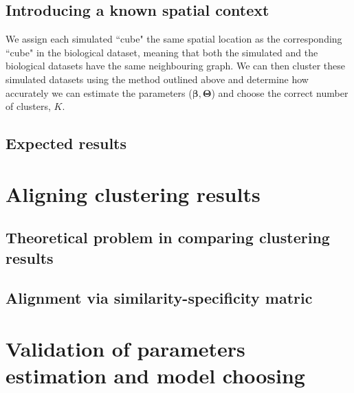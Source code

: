 	\subsection{Introducing a known spatial context}\label{subsec:simul_spatial}
	We assign each simulated ``cube" the same spatial location as the corresponding ``cube" in the biological dataset, meaning that both the simulated and the biological datasets have the same neighbouring graph. We can then cluster these simulated datasets using the method outlined above and determine how accurately we can estimate the parameters ($\mathbf{\beta}, \mathbf{\Theta}$) and choose the correct number of clusters, $K$.\\ 
	\subsection{Expected results}\label{subsec:expected_simul_results}

\section{Aligning clustering results }
	\subsection{Theoretical problem in comparing clustering results}
	\subsection{Alignment via similarity-specificity matric}

\section{Validation of parameters estimation and model choosing}

